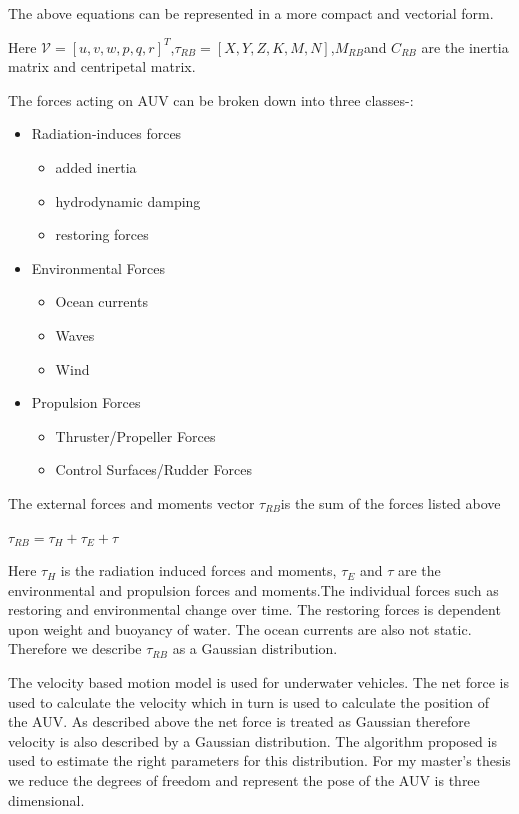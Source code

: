 \documentclass[12pt]{dalcsthesis}
\begin{document}
The above equations can be represented in a more compact and vectorial
form.


Here $\mathcal{V}=[u,v,w,p,q,r]^{T}$,$\tau_{RB}=[X,Y,Z,K,M,N]$,$M_{RB}$and
$C_{RB}$ are the inertia matrix and centripetal matrix. 

The forces acting on AUV can be broken down into three classes-:
\begin{itemize}
\item Radiation-induces forces

\begin{itemize}
\item added inertia
\item hydrodynamic damping
\item restoring forces
\end{itemize}
\item Environmental Forces

\begin{itemize}
\item Ocean currents
\item Waves
\item Wind
\end{itemize}
\item Propulsion Forces

\begin{itemize}
\item Thruster/Propeller Forces
\item Control Surfaces/Rudder Forces
\end{itemize}
\end{itemize}
The external forces and moments vector $\tau_{RB}$is the sum of the
forces listed above 

$\tau_{RB}=\tau_{H}+\tau_{E}+\tau$

Here $\tau_{H}$ is the radiation induced forces and moments, $\tau_{E}$
and $\tau$ are the environmental and propulsion forces and moments.The
individual forces such as restoring and environmental change over
time. The restoring forces is dependent upon weight and buoyancy of
water. The ocean currents are also not static. Therefore we describe
$\tau_{RB}$ as a Gaussian distribution. 

The velocity based motion model is used for underwater vehicles. The
net force is used to calculate the velocity which in turn is used
to calculate the position of the AUV. As described above the net force
is treated as Gaussian therefore velocity is also described by a Gaussian
distribution. The algorithm proposed is used to estimate the right
parameters for this distribution. For my master's thesis we reduce
the degrees of freedom and represent the pose of the AUV is three
dimensional. 
\end{document}
